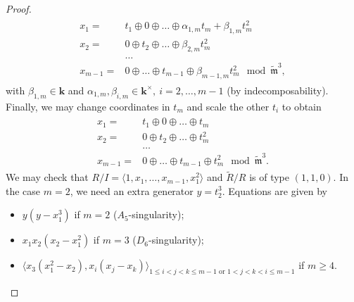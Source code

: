 \documentclass[11pt]{amsart}
\renewcommand{\k}{\mathbf k}
\newcommand{\tR}{\widetilde{R}}
\newcommand{\tm}{\widetilde{\mathfrak m}}
\theoremstyle{plain}
\theoremstyle{definition}
\begin{document}
\begin{proof}
 \begin{align}\label{coordII-cs}
 \begin{split}
  x_1= & t_1\oplus0\oplus\ldots\oplus\alpha_{1,m}t_m+\beta_{1,m}t_m^2\\
  x_2= & 0\oplus t_2\oplus\ldots\oplus\beta_{2,m}t_m^2\\
  &\ldots\\
  x_{m-1}= & 0\oplus\ldots\oplus t_{m-1}\oplus \beta_{m-1,m}t_m^2 \mod\tm^3,
 \end{split}
 \end{align}
 with $\beta_{1,m}\in\k$ and $\alpha_{1,m},\beta_{i,m}\in\k^\times,\ i=2,\ldots,m-1$ (by indecomposability). Finally, we may change coordinates in $t_m$ and scale the other $t_i$ to obtain
 \begin{align}\label{coordII}
 \begin{split}
  x_1= & t_1\oplus0\oplus\ldots\oplus t_m\\
  x_2= & 0\oplus t_2\oplus\ldots\oplus t_m^2\\
  &\ldots\\
  x_{m-1}= & 0\oplus\ldots\oplus t_{m-1}\oplus t_m^2\mod\tm^3.
 \end{split}
 \end{align}
 We may check that $R/I=\langle 1,x_1,\ldots,x_{m-1},x_1^2\rangle$ and $\tR/R$ is of type $(1,1,0)$. In the case $m=2$, we need an extra generator $y=t_2^3$. Equations are given by
 \begin{itemize}
  \item $y(y-x_1^3)$ if $m=2$ ($A_5$-singularity);
  \item $x_1x_2(x_2-x_1^2)$ if $m=3$ ($D_6$-singularity);
  \item $\langle x_3(x_1^2-x_2),x_i(x_j-x_k)\rangle_{1\leq i<j<k\leq m-1 \text{ or }1<j<k<i\leq m-1}$ if $m\geq 4$.
 \end{itemize}


\end{proof}
\end{document}
